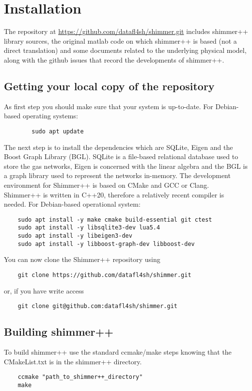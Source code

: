 \section{Installation}

The repository at \url{https://github.com/datafl4sh/shimmer.git} includes shimmer++ library sources, the original matlab code on which shimmer++ is based (not a direct translation) and some documents related to the underlying physical model, along with the github issues that record the developments of shimmer++.  
\subsection{Getting your local copy of the repository}
As first step you should make sure that your system is up-to-date. For Debian-based operating systems: 
    \begin{verbatim}
        sudo apt update
    \end{verbatim}    
The next step is to install the dependencies which are SQLite, Eigen and the Boost Graph Library (BGL). SQLite is a file-based relational database used to store the gas networks, Eigen is concerned with the linear algebra and the BGL is a graph library used to represent the networks in-memory. The development environment for Shimmer++ is based on CMake and GCC or Clang. Shimmer++ is written in C++20, therefore a relatively recent compiler is needed.
For Debian-based operational system: 
\begin{verbatim}
    sudo apt install -y make cmake build-essential git ctest
    sudo apt install -y libsqlite3-dev lua5.4
    sudo apt install -y libeigen3-dev
    sudo apt install -y libboost-graph-dev libboost-dev
\end{verbatim}
   
You can now clone the Shimmer++ repository using
\begin{verbatim}        
    git clone https://github.com/datafl4sh/shimmer.git
\end{verbatim}
or, if you have write access
\begin{verbatim}
    git clone git@github.com:datafl4sh/shimmer.git
\end{verbatim}

\subsection{Building shimmer++}
To build shimmer++ use the standard ccmake/make steps knowing that the CMakeList.txt is in the shimmer++ directory.
\begin{verbatim}
    ccmake "path_to_shimmer++_directory"         
    make  
\end{verbatim}


